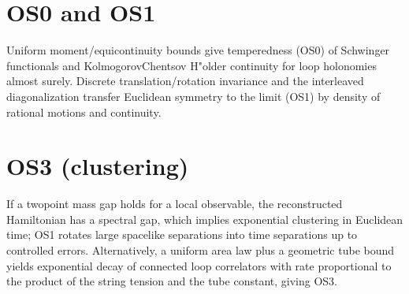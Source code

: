 \documentclass[11pt]{article}
\begin{document}
\section*{OS0 and OS1}

Uniform moment/equicontinuity bounds give temperedness (OS0) of Schwinger functionals and Kolmogorov\-Chentsov H"older continuity for loop holonomies almost surely. Discrete translation/rotation invariance and the interleaved diagonalization transfer Euclidean symmetry to the limit (OS1) by density of rational motions and continuity.

\section*{OS3 (clustering)}

If a two\-point mass gap holds for a local observable, the reconstructed Hamiltonian has a spectral gap, which implies exponential clustering in Euclidean time; OS1 rotates large spacelike separations into time separations up to controlled errors. Alternatively, a uniform area law plus a geometric tube bound yields exponential decay of connected loop correlators with rate proportional to the product of the string tension and the tube constant, giving OS3.
\end{document}
